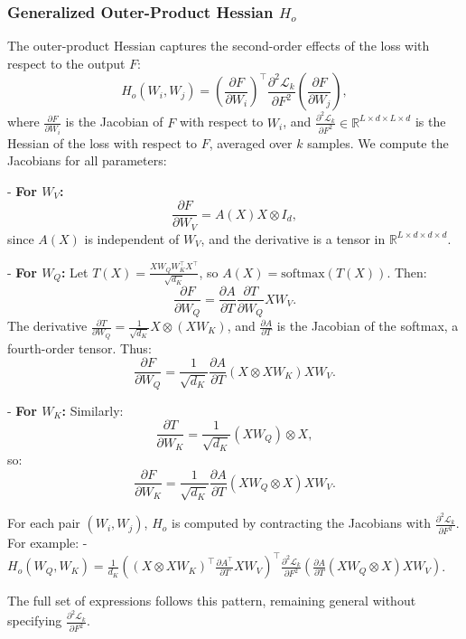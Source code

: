 \documentclass{article}
\begin{document}
\subsubsection{Generalized Outer-Product Hessian \( H_o \)}
The outer-product Hessian captures the second-order effects of the loss with respect to the output \( F \):
\[
H_o(W_i, W_j) = \left( \frac{\partial F}{\partial W_i} \right)^\top \frac{\partial^2 \mathcal{L}_k}{\partial F^2} \left( \frac{\partial F}{\partial W_j} \right),
\]
where \( \frac{\partial F}{\partial W_i} \) is the Jacobian of \( F \) with respect to \( W_i \), and \( \frac{\partial^2 \mathcal{L}_k}{\partial F^2} \in \mathbb{R}^{L \times d \times L \times d} \) is the Hessian of the loss with respect to \( F \), averaged over \( k \) samples. We compute the Jacobians for all parameters:

- \textbf{For \( W_V \):}
\[
\frac{\partial F}{\partial W_V} = A(X) X \otimes I_d,
\]
since \( A(X) \) is independent of \( W_V \), and the derivative is a tensor in \( \mathbb{R}^{L \times d \times d \times d} \).

- \textbf{For \( W_Q \):}
Let \( T(X) = \frac{X W_Q W_K^\top X^\top}{\sqrt{d_K}} \), so \( A(X) = \text{softmax}(T(X)) \). Then:
\[
\frac{\partial F}{\partial W_Q} = \frac{\partial A}{\partial T} \frac{\partial T}{\partial W_Q} X W_V.
\]
The derivative \( \frac{\partial T}{\partial W_Q} = \frac{1}{\sqrt{d_K}} X \otimes (X W_K) \), and \( \frac{\partial A}{\partial T} \) is the Jacobian of the softmax, a fourth-order tensor. Thus:
\[
\frac{\partial F}{\partial W_Q} = \frac{1}{\sqrt{d_K}} \frac{\partial A}{\partial T} (X \otimes X W_K) X W_V.
\]

- \textbf{For \( W_K \):}
Similarly:
\[
\frac{\partial T}{\partial W_K} = \frac{1}{\sqrt{d_K}} (X W_Q) \otimes X,
\]
so:
\[
\frac{\partial F}{\partial W_K} = \frac{1}{\sqrt{d_K}} \frac{\partial A}{\partial T} (X W_Q \otimes X) X W_V.
\]

For each pair \( (W_i, W_j) \), \( H_o \) is computed by contracting the Jacobians with \( \frac{\partial^2 \mathcal{L}_k}{\partial F^2} \). For example:
- \( H_o(W_Q, W_K) = \frac{1}{d_K} \left( (X \otimes X W_K)^\top \frac{\partial A^\top}{\partial T} X W_V \right)^\top \frac{\partial^2 \mathcal{L}_k}{\partial F^2} \left( \frac{\partial A}{\partial T} (X W_Q \otimes X) X W_V \right) \).

The full set of expressions follows this pattern, remaining general without specifying \( \frac{\partial^2 \mathcal{L}_k}{\partial F^2} \).
\end{document}

